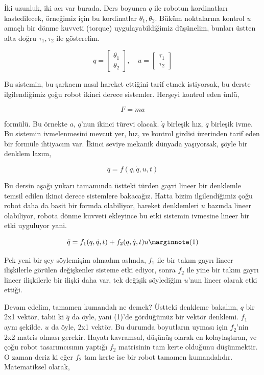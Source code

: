 \documentclass[12pt,fleqn]{article}\usepackage{../../common}
\begin{document}
İki uzunluk, iki acı var burada. Ders boyunca $q$ ile robotun kordinatları
kastedilecek, örneğimiz için bu kordinatlar $\theta_1,\theta_2$. Büküm
noktalarına kontrol $u$ amaçlı bir dönme kuvveti (torque) uygulayabildiğimiz
düşünelim, bunları üstten alta doğru $\tau_1,\tau_2$ ile gösterelim.

$$
q = 
\left[\begin{array}{r}
\theta_1 \\
\theta_2
\end{array}\right], \quad
u = \left[\begin{array}{r}
\tau_1 \\
\tau_2
\end{array}\right]
$$

Bu sistemin, bu şarkacın nasıl hareket ettiğini tarif etmek istiyorsak, bu
derste ilgilendiğimiz çoğu robot ikinci derece sistemler. Herşeyi kontrol
eden ünlü,

$$
F = ma
$$

formülü. Bu örnekte $a$, $q$'nun ikinci türevi olacak. $\dot{q}$ birleşik
hız, $\ddot{q}$ birleşik ivme. Bu sistemin ivmelenmesini mevcut yer, hız,
ve kontrol girdisi üzerinden tarif eden bir formüle ihtiyacım var. İkinci
seviye mekanik dünyada yaşıyorsak, şöyle bir denklem lazım,

$$
\ddot{q} = f(q,\dot{q},u,t)
$$

Bu dersin aşağı yukarı tamamında üstteki türden gayri lineer bir denklemle
temsil edilen ikinci derece sistemlere bakacağız. Hatta bizim
ilgilendiğimiz çoğu robot daha da basit bir formda olabiliyor, hareket
denklemleri $u$ bazında lineer olabiliyor, robota dönme kuvveti ekleyince
bu etki sistemin ivmesine lineer bir etki uyguluyor yani.

$$
\ddot{q} = f_1 (q, \dot{q}, t) + f_2 (q, \dot{q}, t) u 
\mlabel{1}
$$

Pek yeni bir şey söylemişim olmadım aslında, $f_1$ ile bir takım gayrı
lineer ilişkilerle görülen değişkenler sisteme etki ediyor, sonra $f_2$ ile
yine bir takım gayrı lineer ilişkilerle bir ilişki daha var, tek değişik
söylediğim $u$'nun lineer olarak etki ettiği. 

Devam edelim, tamamen kumandalı ne demek? Üstteki denkleme bakalım, $q$ bir
2x1 vektör, tabii ki $\ddot{q}$ da öyle, yani (1)'de gördüğümüz bir vektör
denklemi. $f_1$ aynı şekilde. $u$ da öyle, 2x1 vektör. Bu durumda
boyutların uyması için $f_2$'nin 2x2 matris olması gerekir. Hayatı
kavramsal, düşünüş olarak en kolaylaştıran, ve çoğu robot tasarımcısının
yaptığı $f_2$ matrisinin tam kerte olduğunu düşünmektir. O zaman deriz ki
eğer $f_2$ tam kerte ise bir robot tamamen kumandalıdır. Matematiksel olarak,
\end{document}
